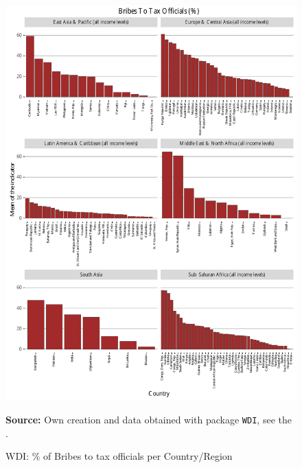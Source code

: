 \begin{figure}[H]
\begin{center}
\caption{WDI: \% of Bribes to tax officials per Country/Region}
\label{fig_wdi_bribes}
\includegraphics[max height=.9\textheight]{../img/wdi_bribes_to_tax_officials_perc.pdf}
\end{center}
\noindent \footnotesize{\textbf{Source:} Own creation and data obtained with package \texttt{WDI}, see the \cite{wb_r}.}
\end{figure}

